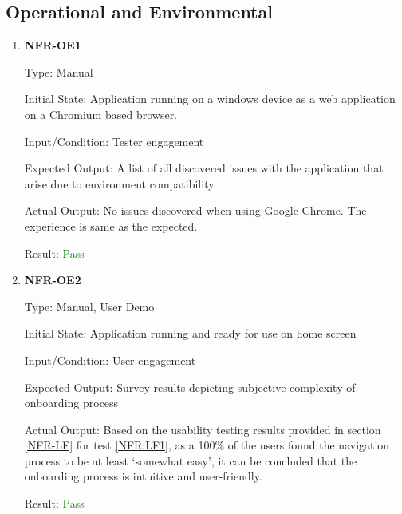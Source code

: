 \documentclass[12pt, titlepage]{article}
\begin{document}
\subsection{Operational and Environmental}
\begin{enumerate}
\item{\textbf{NFR-OE1}} \label{NFR:OE1}

Type: Manual

Initial State: Application running on a windows device as a web application on a
Chromium based browser.

Input/Condition: Tester engagement

Expected Output: A list of all discovered issues with the application that arise
due to environment compatibility

Actual Output: No issues discovered when using Google Chrome. The experience is
same as the expected.

Result: \textcolor{green}{Pass} 
            
\item\textbf{{NFR-OE2}} \label{NFR:OE2}

Type: Manual, User Demo

Initial State: Application running and ready for use on home screen

Input/Condition: User engagement

Expected Output: Survey results depicting subjective complexity of onboarding
process

Actual Output: \newline
Based on the usability testing results provided in section \ref{NFR-LF} for test
\ref{NFR:LF1}, as a 100\% of the users found the navigation process to be at
least `somewhat easy', it can be concluded that the onboarding process is
intuitive and user-friendly.

Result: \textcolor{green}{Pass}
\end{enumerate}
\end{document}
